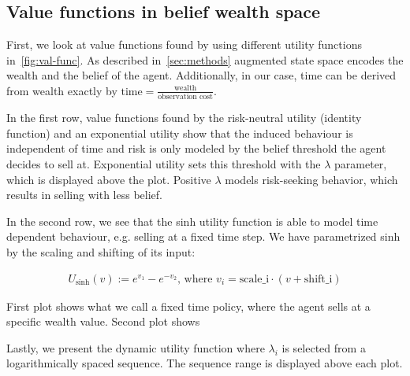 \subsection{Value functions in belief wealth space}\label{ssec:val-func}

First, we look at value functions found by using different utility functions in~\autoref{fig:val-func}.
As described in~\autoref{sec:methods} augmented state space encodes the wealth and the belief of the agent. 
Additionally, in our case, time can be derived from wealth exactly by $\text{time} = \frac{\text{wealth}}{\text{observation\ cost}}$.

In the first row, value functions found by the risk-neutral utility (identity function) and an exponential utility show that the induced behaviour is independent of time and risk is only modeled by the belief threshold the agent decides to sell at.
Exponential utility sets this threshold with the $\lambda$ parameter, which is displayed above the plot.
Positive $\lambda$ models risk-seeking behavior, which results in selling with less belief.

In the second row, we see that the sinh utility function is able to model time dependent behaviour, e.g. selling at a fixed time step. We have parametrized sinh by the scaling and shifting of its input:

\begin{align*}
    U_\text{sinh}(v) := e^{v_1} - e^{-v_2} \text{, where\ } v_i = \text{scale_i}\cdot(v+\text{shift_i})
\end{align*}

First plot shows what we call a fixed time policy, where the agent sells at a specific wealth value.
Second plot shows 

Lastly, we present the dynamic utility function where $\lambda_i$ is selected from a logarithmically spaced sequence. The sequence range is displayed above each plot.


